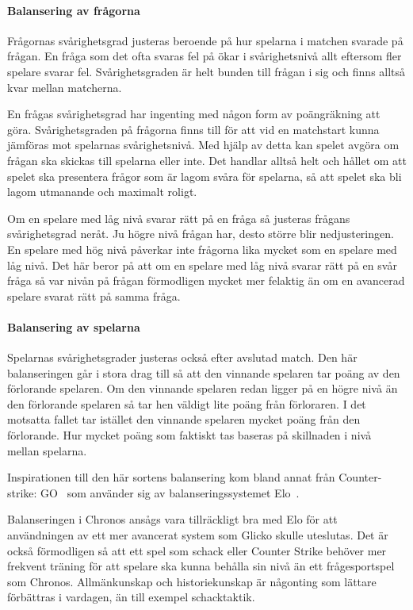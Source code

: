 \documentclass[a4paper, 11pt]{article}
\begin{document}
\paragraph{Balansering av frågorna}

Frågornas svårighetsgrad justeras beroende på hur spelarna i matchen svarade på frågan. En fråga som det ofta svaras fel på ökar i svårighetsnivå allt eftersom fler spelare svarar fel. Svårighetsgraden är helt bunden till frågan i sig och finns alltså kvar mellan matcherna.

En frågas svårighetsgrad har ingenting med någon form av poängräkning att göra. Svårighetsgraden på frågorna finns till för att vid en matchstart kunna jämföras mot spelarnas svårighetsnivå. Med hjälp av detta kan spelet avgöra om frågan ska skickas till spelarna eller inte. Det handlar alltså helt och hållet om att spelet ska presentera frågor som är lagom svåra för spelarna, så att spelet ska bli lagom utmanande och maximalt roligt.

Om en spelare med låg nivå svarar rätt på en fråga så justeras frågans svårighetsgrad neråt. Ju högre nivå frågan har, desto större blir nedjusteringen. En spelare med hög nivå påverkar inte frågorna lika mycket som en spelare med låg nivå. Det här beror på att om en spelare med låg nivå svarar rätt på en svår fråga så var nivån på frågan förmodligen mycket mer felaktig än om en avancerad spelare svarat rätt på samma fråga. 

\paragraph{Balansering av spelarna}

Spelarnas svårighetsgrader justeras också efter avslutad match. Den här balanseringen går i stora drag till så att den vinnande spelaren tar poäng av den förlorande spelaren. Om den vinnande spelaren redan ligger på en högre nivå än den förlorande spelaren så tar hen väldigt lite poäng från förloraren. I det motsatta fallet tar istället den vinnande spelaren mycket poäng från den förlorande. Hur mycket poäng som faktiskt tas baseras på skillnaden i nivå mellan spelarna. 

Inspirationen till den här sortens balansering kom bland annat från Counter-strike: GO~\cite{cs} som använder sig av balanseringssystemet Elo~\cite{elo}. 

Balanseringen i Chronos ansågs vara tillräckligt bra med Elo för att användningen av ett mer avancerat system som Glicko skulle uteslutas. Det är också förmodligen så att ett spel som schack eller Counter Strike behöver mer frekvent träning för att spelare ska kunna behålla sin nivå än ett frågesportspel som Chronos. Allmänkunskap och historiekunskap är någonting som lättare förbättras i vardagen, än till exempel schacktaktik. 
\end{document}
